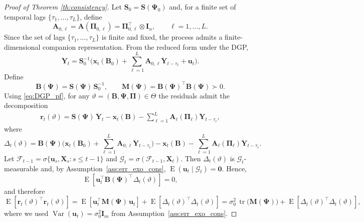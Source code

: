 \documentclass[12pt]{article}
\theoremstyle{plain}
\theoremstyle{definition}
\newcommand{\xvec}{\boldsymbol}
\newcommand{\xmat}{\mathbf}
\DeclareMathOperator{\E}{E}
\DeclareMathOperator{\Var}{Var}
\DeclareMathOperator{\tr}{tr}
\begin{document}
\begin{proof}[Proof of Theorem \ref{th:consistency}]
Let $\xmat{S}_0=\xmat{S}(\xmat{\Psi}_0)$ and, for a finite set of temporal lags 
$\{\tau_1,\dots,\tau_L\}$, define
\[
\xmat{A}_{0,\ell}
=
\xmat{A}(\xmat{\Pi}_{0,\ell})
=
\xmat{\Pi}_{0,\ell}^{\top}\otimes \xmat{I}_n,
\qquad \ell=1,\dots,L.
\]
Since the set of lags $\{\tau_1,\dots,\tau_L\}$ is finite and fixed, the process admits a finite-dimensional companion representation. From the reduced form under the DGP,
\begin{equation}\label{eq:DGP_pf}
\ddot{\xvec{Y}}_t
=
\xmat{S}_0^{-1}
\Big(
\xvec{x}_t(\xmat{B}_0)
+
\sum_{\ell=1}^{L}
\xmat{A}_{0,\ell}\ddot{\xvec{Y}}_{t-\tau_\ell}
+
\xvec{u}_t
\Big).
\end{equation}
Define
\[
\xmat{B}(\xmat{\Psi})
=
\xmat{S}(\xmat{\Psi})\,\xmat{S}_0^{-1},
\qquad
\xmat{M}(\xmat{\Psi})
=
\xmat{B}(\xmat{\Psi})^\top \xmat{B}(\xmat{\Psi})\succ 0.
\]
Using \eqref{eq:DGP_pf}, for any $\vartheta=(\xmat{B},\xmat{\Psi},\xmat{\Pi})\in\Theta$ the residuals admit the decomposition
\begin{align}
\xvec{r}_t(\vartheta)
=
\xmat{S}(\xmat{\Psi})\,\ddot{\xvec{Y}}_t
-\xvec{x}_t(\xmat{B})
-
\sum_{\ell=1}^{L}
\xmat{A}_{\ell}(\xmat{\Pi}_{\ell})
\ddot{\xvec{Y}}_{t-\tau_\ell},\label{eq:r_decomp_pf}
\end{align}
where
\begin{equation}\label{eq:Delta_pf}
\Delta_t(\vartheta)
=
\xmat{B}(\xmat{\Psi})
\Big(
\xvec{x}_t(\xmat{B}_0)
+
\sum_{\ell=1}^{L}
\xmat{A}_{0,\ell}\ddot{\xvec{Y}}_{t-\tau_\ell}
\Big)
-
\xvec{x}_t(\xmat{B})
-
\sum_{\ell=1}^{L}
\xmat{A}_{\ell}(\xmat{\Pi}_{\ell})
\ddot{\xvec{Y}}_{t-\tau_\ell}.
\end{equation}
Let $\mathcal{F}_{t-1}=\sigma\{\xvec{u}_s,\xmat{X}_s:s\le t-1\}$ and $\mathcal{G}_t=\sigma(\mathcal{F}_{t-1},\xmat{X}_t)$.
Then $\Delta_t(\vartheta)$ is $\mathcal{G}_t$-measurable and, by Assumption~\ref{ass:err_exo_cons},
$\E(\xvec{u}_t\mid\mathcal{G}_t)=\xvec{0}$. Hence,
\[
\E\!\left[\xvec{u}_t^\top \xmat{B}(\xmat{\Psi})^\top \Delta_t(\vartheta)\right]=0,
\]
and therefore
\begin{equation}\label{eq:Ert_pf}
\E\!\left[\xvec{r}_t(\vartheta)^\top\xvec{r}_t(\vartheta)\right]
=
\E\!\left[\xvec{u}_t^\top \xmat{M}(\xmat{\Psi})\,\xvec{u}_t\right]
+\E\!\left[\Delta_t(\vartheta)^\top\Delta_t(\vartheta)\right]
=
\sigma_0^2\,\tr\!\big(\xmat{M}(\xmat{\Psi})\big)
+\E\!\left[\Delta_t(\vartheta)^\top\Delta_t(\vartheta)\right],
\end{equation}
where we used $\Var(\xvec{u}_t)=\sigma_0^2\xmat{I}_m$ from Assumption~\ref{ass:err_exo_cons}.


\end{proof}
\end{document}
